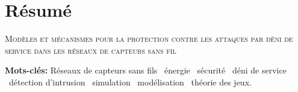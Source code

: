 \chapter[Résumé (français)]{Résumé}

\begin{center}
    \LARGE\scshape\color{chapterLACL}Modèles et mécanismes pour la protection contre les attaques par déni de service dans les réseaux de capteurs sans fil
\end{center}
\vspace{2\baselineskip}



\vspace{2\baselineskip}
\noindent\textbf{Mots-clés:} Réseaux de capteurs sans fils \textbullet\ énergie \textbullet\ sécurité \textbullet\ déni de service \textbullet\ détection d'intrusion \textbullet\ simulation \textbullet\ modélisation \textbullet\ théorie des jeux.

